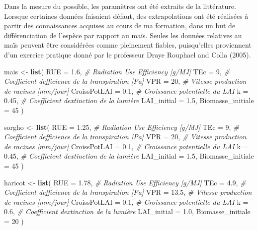 \documentclass[
]{article}
\newenvironment{Shaded}{\begin{snugshade}}{\end{snugshade}}
\newcommand{\AttributeTok}[1]{\textcolor[rgb]{0.13,0.29,0.53}{#1}}
\newcommand{\CommentTok}[1]{\textcolor[rgb]{0.56,0.35,0.01}{\textit{#1}}}
\newcommand{\DecValTok}[1]{\textcolor[rgb]{0.00,0.00,0.81}{#1}}
\newcommand{\FloatTok}[1]{\textcolor[rgb]{0.00,0.00,0.81}{#1}}
\newcommand{\FunctionTok}[1]{\textcolor[rgb]{0.13,0.29,0.53}{\textbf{#1}}}
\newcommand{\NormalTok}[1]{#1}
\newcommand{\OtherTok}[1]{\textcolor[rgb]{0.56,0.35,0.01}{#1}}
\begin{document}
Dans la mesure du possible, les paramètres ont été extraits de la
littérature. Lorsque certaines données faisaient défaut, des
extrapolations ont été réalisées à partir des connaissances acquises au
cours de ma formation, dans un but de différenciation de l'espèce par
rapport au maïs. Seules les données relatives au maïs peuvent être
considérées comme pleinement fiables, puisqu'elles proviennent d'un
exercice pratique donné par le professeur Draye Rouphael and Colla
(2005).

\begin{Shaded}
\begin{Highlighting}[]
\NormalTok{mais }\OtherTok{\textless{}{-}} \FunctionTok{list}\NormalTok{(}
  \AttributeTok{RUE               =} \FloatTok{1.6}\NormalTok{,   }\CommentTok{\# Radiation Use Efficiency [g/MJ]}
  \AttributeTok{TEc               =} \DecValTok{9}\NormalTok{,     }\CommentTok{\# Coefficient d\textquotesingle{}efficience de la transpiration [Pa]}
  \AttributeTok{VPR               =} \DecValTok{20}\NormalTok{,    }\CommentTok{\# Vitesse production de racines [mm/jour]}
  \AttributeTok{CroissPotLAI      =} \FloatTok{0.1}\NormalTok{,   }\CommentTok{\# Croissance potentielle du LAI }
  \AttributeTok{k                 =} \FloatTok{0.45}\NormalTok{,  }\CommentTok{\# Coefficient d\textquotesingle{}extinction de la lumière}
  \AttributeTok{LAI\_initial       =} \FloatTok{1.5}\NormalTok{,   }
  \AttributeTok{Biomasse\_initiale =} \DecValTok{45}     
\NormalTok{)}

\NormalTok{sorgho }\OtherTok{\textless{}{-}} \FunctionTok{list}\NormalTok{(}
  \AttributeTok{RUE               =} \FloatTok{1.25}\NormalTok{,  }\CommentTok{\# Radiation Use Efficiency [g/MJ]}
  \AttributeTok{TEc               =} \DecValTok{9}\NormalTok{,     }\CommentTok{\# Coefficient d\textquotesingle{}efficience de la transpiration [Pa]}
  \AttributeTok{VPR               =} \DecValTok{20}\NormalTok{,    }\CommentTok{\# Vitesse production de racines [mm/jour]}
  \AttributeTok{CroissPotLAI      =} \FloatTok{0.1}\NormalTok{,   }\CommentTok{\# Croissance potentielle du LAI }
  \AttributeTok{k                 =} \FloatTok{0.45}\NormalTok{,  }\CommentTok{\# Coefficient d\textquotesingle{}extinction de la lumière}
  \AttributeTok{LAI\_initial       =} \FloatTok{1.5}\NormalTok{,   }
  \AttributeTok{Biomasse\_initiale =} \DecValTok{45}     
\NormalTok{)}

\NormalTok{haricot }\OtherTok{\textless{}{-}} \FunctionTok{list}\NormalTok{(}
  \AttributeTok{RUE               =} \FloatTok{1.78}\NormalTok{,  }\CommentTok{\# Radiation Use Efficiency [g/MJ]}
  \AttributeTok{TEc               =} \FloatTok{4.9}\NormalTok{,   }\CommentTok{\# Coefficient d\textquotesingle{}efficience de la transpiration [Pa]}
  \AttributeTok{VPR               =} \FloatTok{13.5}\NormalTok{,  }\CommentTok{\# Vitesse production de racines [mm/jour]}
  \AttributeTok{CroissPotLAI      =} \FloatTok{0.1}\NormalTok{,   }\CommentTok{\# Croissance potentielle du LAI }
  \AttributeTok{k                 =} \FloatTok{0.6}\NormalTok{,   }\CommentTok{\# Coefficient d\textquotesingle{}extinction de la lumière}
  \AttributeTok{LAI\_initial       =} \FloatTok{1.0}\NormalTok{,   }
  \AttributeTok{Biomasse\_initiale =} \DecValTok{20}     
\NormalTok{)}


\end{Highlighting}
\end{Shaded}
\end{document}
